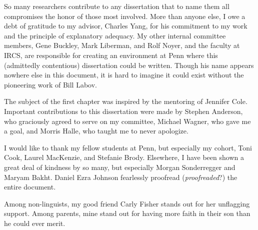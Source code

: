 So many researchers contribute to any dissertation that to name them all compromises the honor of those most involved. More than anyone else, I owe a debt of gratitude to my advisor, Charles Yang, for his commitment to my work and the principle of explanatory adequacy. My other internal committee members, Gene Buckley, Mark Liberman, and Rolf Noyer, and the faculty at IRCS, are responsible for creating an environment at Penn where this (admittedly contentious) dissertation could be written. Though his name appears nowhere else in this document, it is hard to imagine it could exist without the pioneering work of Bill Labov.

The subject of the first chapter was inspired by the mentoring of Jennifer Cole. Important contributions to this dissertation were made by Stephen Anderson, who graciously agreed to serve on my committee, Michael Wagner, who gave me a goal, and Morris Halle, who taught me to never apologize.

I would like to thank my fellow students at Penn, but especially my cohort, Toni Cook, Laurel MacKenzie, and Stefanie Brody. Elsewhere, I have been shown a great deal of kindness by so many, but especially Morgan Sonderregger and Maryam Bakht. Daniel Ezra Johnson fearlessly proofread (\emph{proofreaded}?) the entire document. 

Among non-linguists, my good friend Carly Fisher stands out for her unflagging support. Among parents, mine stand out for having more faith in their son than he could ever merit. 
